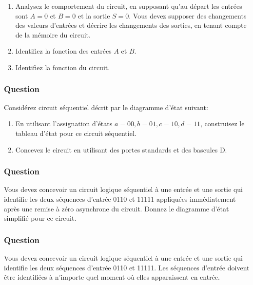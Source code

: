 \documentclass[11pt]{article}
\begin{document}
\begin{enumerate}
\item Analysez le comportement du circuit, en supposant qu'au départ les
entrées sont \(A=0\) et \(B=0\) et la sortie \(S=0\). Vous devez
supposer des changements des valeurs d'entrées et décrire les
changements des sorties, en tenant compte de la mémoire du
circuit.

\item Identifiez la fonction des entrées \(A\) et \(B\).

\item Identifiez la fonction du circuit.
\end{enumerate}

\subsubsection*{Question}
\label{sec:orgb9bd255}
Considérez circuit séquentiel décrit par le diagramme d'état suivant:
\begin{center}

\end{center}
\begin{enumerate}
\item En utilisant l'assignation d'états \(a = 00, b = 01, c = 10, d
         = 11\), construisez le tableau d'état pour ce circuit séquentiel.

\item Concevez le circuit en utilisant des portes standards et des
bascules D.
\end{enumerate}

\subsubsection*{Question}
\label{sec:org082062d}
Vous devez concevoir un circuit logique séquentiel à une entrée et
  une sortie qui identifie les deux séquences d'entrée 0110 et 11111
  appliquées immédiatement après une remise à zéro asynchrone du
  circuit. Donnez le diagramme d'état simplifié pour ce circuit.

\subsubsection*{Question}
\label{sec:org3da150f}
Vous devez concevoir un circuit logique séquentiel à une entrée et
 une sortie qui identifie les deux séquences d'entrée 0110
 et 11111. Les séquences d'entrée doivent être identifiées à
 n'importe quel moment où elles apparaissent en entrée.
\end{document}
